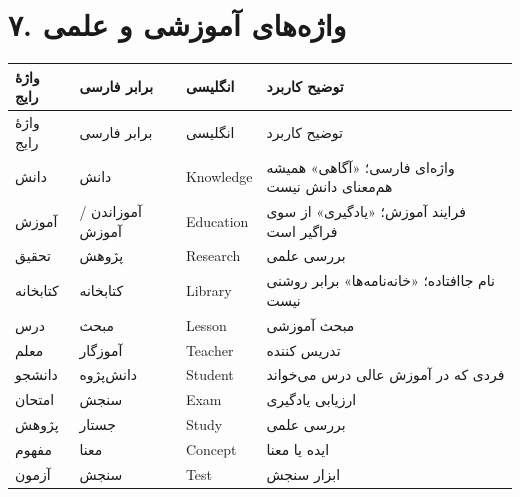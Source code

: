 \documentclass[a4paper,12pt,openany]{book}
\begin{document}
\section*{۷. واژه‌های آموزشی و علمی}
\begingroup
\small
\setlength{\tabcolsep}{4pt}
\renewcommand{\arraystretch}{1.25}
\begin{longtable}{|p{2.5cm}|p{4.0cm}|p{2.3cm}|p{5.3cm}|}
\hline
واژهٔ رایج & برابر فارسی & انگلیسی & توضیح کاربرد \\
\hline
\endfirsthead
\hline
واژهٔ رایج & برابر فارسی & انگلیسی & توضیح کاربرد \\
\hline
\endhead
دانش & دانش & \textenglish{Knowledge} & واژه‌ای فارسی؛ «آگاهی» همیشه هم‌معنای دانش نیست \\
آموزش & آموزاندن / آموزش & \textenglish{Education} & فرایند آموزش؛ «یادگیری» از سوی فراگیر است \\
تحقیق & پژوهش & \textenglish{Research} & بررسی علمی \\
کتابخانه & کتابخانه & \textenglish{Library} & نام جاافتاده؛ «خانه‌نامه‌ها» برابر روشنی نیست \\
درس & مبحث & \textenglish{Lesson} & مبحث آموزشی \\
معلم & آموزگار & \textenglish{Teacher} & تدریس کننده \\
دانشجو & دانش‌پژوه & \textenglish{Student} & فردی که در آموزش عالی درس می‌خواند \\
امتحان & سنجش & \textenglish{Exam} & ارزیابی یادگیری \\
پژوهش & جستار & \textenglish{Study} & بررسی علمی \\
مفهوم & معنا & \textenglish{Concept} & ایده یا معنا \\
آزمون & سنجش & \textenglish{Test} & ابزار سنجش \\
\hline
\end{longtable}
\endgroup
\end{document}
